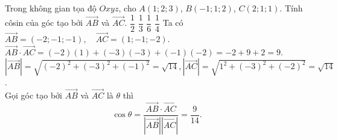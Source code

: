 \begin{ex}%
	Trong không gian tọa độ $Oxyz$, cho $A(1; 2; 3)$, $B(-1; 1; 2)$, $C(2; 1; 1)$. Tính côsin của góc tạo bởi $\overrightarrow{AB}$ và $\overrightarrow{AC}$.
	\choice
	{$\dfrac{1}{2}$}
	{$\dfrac{1}{3}$}
	{\True $\dfrac{1}{6}$}
	{$\dfrac{1}{4}$}
	\loigiai
	{
		Ta có $\overrightarrow{AB} = (-2; -1; -1), \quad \overrightarrow{AC} = (1; -1; -2)$.\\
		$\overrightarrow{AB} \cdot \overrightarrow{AC} = (-2)(1) + (-3)(-3) + (-1)(-2) = -2 + 9 + 2 = 9$.\\
		$ \left|\overrightarrow{AB}\right| = \sqrt{(-2)^2 + (-3)^2 + (-1)^2} = \sqrt{14}, \left|\overrightarrow{AC}\right| = \sqrt{1^2 + (-3)^2 + (-2)^2} = \sqrt{14}$.\\
		Gọi góc tạo bởi $\overrightarrow{AB}$ và $\overrightarrow{AC}$ là $\theta$ thì\\
		\[
			\cos \theta = \frac{\overrightarrow{AB} \cdot \overrightarrow{AC}}{\left|\overrightarrow{AB}\right| \left|\overrightarrow{AC}\right|} = \frac{9}{14}.
		\]
	}
\end{ex}

